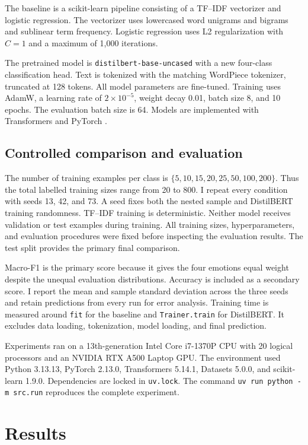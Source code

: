 \documentclass[11pt,a4paper]{article}
\begin{document}
The baseline is a scikit-learn pipeline \citep{pedregosa2011scikit} consisting
of a TF--IDF vectorizer and logistic regression. The vectorizer uses lowercased
word unigrams and bigrams and sublinear term frequency. Logistic regression uses
L2 regularization with $C=1$ and a maximum of 1,000 iterations.

The pretrained model is \texttt{distilbert-base-uncased} with a new four-class
classification head. Text is tokenized with the matching WordPiece tokenizer,
truncated at 128 tokens. All model
parameters are fine-tuned. Training uses AdamW, a learning rate of $2\times
10^{-5}$, weight decay 0.01, batch size 8, and 10 epochs. The evaluation batch
size is 64. Models are implemented with Transformers and PyTorch
\citep{wolf2020transformers,paszke2019pytorch}.

\subsection{Controlled comparison and evaluation}

The number of training examples per class is
$\{5,10,15,20,25,50,100,200\}$. Thus the total labelled training sizes range
from 20 to 800. I repeat every condition with seeds 13, 42, and 73. A seed fixes
both the nested sample and DistilBERT training randomness. TF--IDF training is
deterministic. Neither model receives validation or
test examples during training. All training sizes, hyperparameters, and
evaluation procedures were fixed before inspecting the evaluation results. The
test split provides the primary final comparison.

Macro-F1 is the primary score because it gives the four emotions equal weight
despite the unequal evaluation distributions. Accuracy is included as a
secondary score. I report the mean and sample standard deviation across the
three seeds and retain predictions from every run for error analysis. Training
time is measured around \texttt{fit} for the baseline and
\texttt{Trainer.train} for DistilBERT. It excludes data loading, tokenization,
model loading, and final prediction.

Experiments ran on a 13th-generation Intel Core i7-1370P CPU with 20 logical
processors and an NVIDIA RTX A500 Laptop GPU. The environment used Python 3.13.13, PyTorch
2.13.0, Transformers 5.14.1, Datasets 5.0.0, and scikit-learn 1.9.0. Dependencies
are locked in \texttt{uv.lock}. The command \texttt{uv run python -m src.run}
reproduces the complete experiment.

\section{Results}
\end{document}
